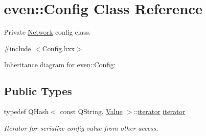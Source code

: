 \hypertarget{classeven_1_1_config}{}\section{even\+:\+:Config Class Reference}
\label{classeven_1_1_config}


Private \mbox{\hyperlink{classeven_1_1_network}{Network}} config class.  




{\ttfamily \#include $<$Config.\+hxx$>$}



Inheritance diagram for even\+:\+:Config\+:
\subsection*{Public Types}
\begin{DoxyCompactItemize}
\item 
\mbox{\label{classeven_1_1_config_a73a9be0e3c55ee84a7300c2e271ae541}} 
typedef Q\+Hash$<$ const Q\+String, \mbox{\hyperlink{classeven_1_1_value}{Value}} $>$\+::\mbox{\hyperlink{classeven_1_1_config_a73a9be0e3c55ee84a7300c2e271ae541}{iterator}} \mbox{\hyperlink{classeven_1_1_config_a73a9be0e3c55ee84a7300c2e271ae541}{iterator}}
\begin{DoxyCompactList}\small\item\em Iterator for serialize config value from other access. \end{DoxyCompactList}\end{DoxyCompactItemize}
